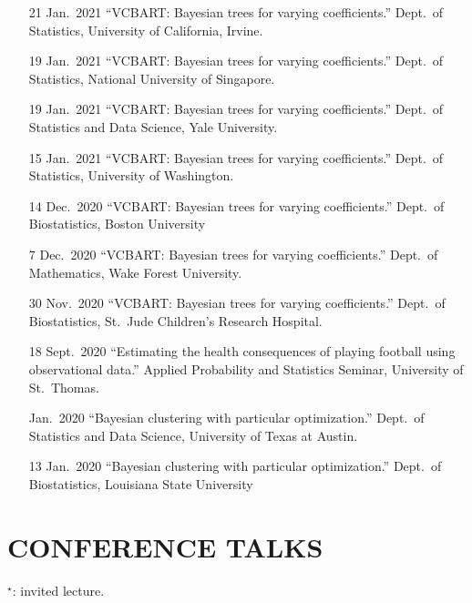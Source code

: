 \documentclass[margin]{res}
\begin{document}
\begin{resume}
{\begin{itemize}
\item[21 Jan.~2021]{``VCBART: Bayesian trees for varying coefficients.'' Dept.~of Statistics, University of California, Irvine.}

\item[19 Jan.~2021]{``VCBART: Bayesian trees for varying coefficients.'' Dept.~of Statistics, National University of Singapore.}

\item[19 Jan.~2021]{``VCBART: Bayesian trees for varying coefficients.'' Dept.~of Statistics and Data Science, Yale University.}

\item[15 Jan.~2021]{``VCBART: Bayesian trees for varying coefficients.'' Dept.~of Statistics, University of Washington.}

\item[14 Dec.~2020]{``VCBART: Bayesian trees for varying coefficients.'' Dept.~of Biostatistics, Boston University}

\item[7 Dec.~2020]{``VCBART: Bayesian trees for varying coefficients.'' Dept.~of Mathematics, Wake Forest University.}

\item[30 Nov.~2020]{``VCBART: Bayesian trees for varying coefficients.'' Dept.~of Biostatistics, St.~Jude Children's Research Hospital.}

\item[18 Sept.~2020]{``Estimating the health consequences of playing football using observational data.'' Applied Probability and Statistics Seminar, University of St.~Thomas.} 

\item[Jan.~2020]{``Bayesian clustering with particular optimization.'' Dept.~of Statistics and Data Science, University of Texas at Austin.}

\item[13 Jan.~2020]{``Bayesian clustering with particular optimization.'' Dept.~of Biostatistics, Louisiana State University}
\end{itemize}
}
\section{CONFERENCE TALKS}
\vspace{0.1in}
$^{\star}$: invited lecture.

\vspace{0.1in}
{\small
\begin{itemize}


\end{itemize}}
\end{resume}
\end{document}
